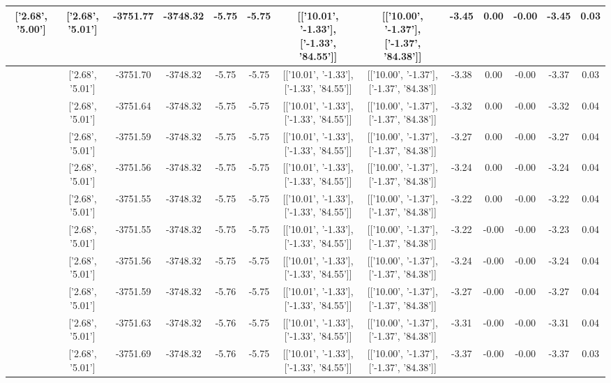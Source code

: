\begin{table}[htbp]
\begin{adjustbox}{angle=90}
\begin{tabular}{|c|c|c|c|c|c|c|c|c|c|c|c|c|}
 ['2.68', '5.00'] & ['2.68', '5.01'] & -3751.77 & -3748.32 & -5.75 & -5.75 & [['10.01', '-1.33'], ['-1.33', '84.55']] & [['10.00', '-1.37'], ['-1.37', '84.38']] & -3.45 & 0.00 & -0.00 & -3.45 & 0.03\\ \hline
 ['2.68', '5.00'] & ['2.68', '5.01'] & -3751.70 & -3748.32 & -5.75 & -5.75 & [['10.01', '-1.33'], ['-1.33', '84.55']] & [['10.00', '-1.37'], ['-1.37', '84.38']] & -3.38 & 0.00 & -0.00 & -3.37 & 0.03\\ \hline
 ['2.68', '5.00'] & ['2.68', '5.01'] & -3751.64 & -3748.32 & -5.75 & -5.75 & [['10.01', '-1.33'], ['-1.33', '84.55']] & [['10.00', '-1.37'], ['-1.37', '84.38']] & -3.32 & 0.00 & -0.00 & -3.32 & 0.04\\ \hline
 ['2.68', '5.00'] & ['2.68', '5.01'] & -3751.59 & -3748.32 & -5.75 & -5.75 & [['10.01', '-1.33'], ['-1.33', '84.55']] & [['10.00', '-1.37'], ['-1.37', '84.38']] & -3.27 & 0.00 & -0.00 & -3.27 & 0.04\\ \hline
 ['2.68', '5.01'] & ['2.68', '5.01'] & -3751.56 & -3748.32 & -5.75 & -5.75 & [['10.01', '-1.33'], ['-1.33', '84.55']] & [['10.00', '-1.37'], ['-1.37', '84.38']] & -3.24 & 0.00 & -0.00 & -3.24 & 0.04\\ \hline
 ['2.68', '5.01'] & ['2.68', '5.01'] & -3751.55 & -3748.32 & -5.75 & -5.75 & [['10.01', '-1.33'], ['-1.33', '84.55']] & [['10.00', '-1.37'], ['-1.37', '84.38']] & -3.22 & 0.00 & -0.00 & -3.22 & 0.04\\ \hline
 ['2.68', '5.01'] & ['2.68', '5.01'] & -3751.55 & -3748.32 & -5.75 & -5.75 & [['10.01', '-1.33'], ['-1.33', '84.55']] & [['10.00', '-1.37'], ['-1.37', '84.38']] & -3.22 & -0.00 & -0.00 & -3.23 & 0.04\\ \hline
 ['2.69', '5.01'] & ['2.68', '5.01'] & -3751.56 & -3748.32 & -5.75 & -5.75 & [['10.01', '-1.33'], ['-1.33', '84.55']] & [['10.00', '-1.37'], ['-1.37', '84.38']] & -3.24 & -0.00 & -0.00 & -3.24 & 0.04\\ \hline
 ['2.69', '5.01'] & ['2.68', '5.01'] & -3751.59 & -3748.32 & -5.76 & -5.75 & [['10.01', '-1.33'], ['-1.33', '84.55']] & [['10.00', '-1.37'], ['-1.37', '84.38']] & -3.27 & -0.00 & -0.00 & -3.27 & 0.04\\ \hline
 ['2.69', '5.01'] & ['2.68', '5.01'] & -3751.63 & -3748.32 & -5.76 & -5.75 & [['10.01', '-1.33'], ['-1.33', '84.55']] & [['10.00', '-1.37'], ['-1.37', '84.38']] & -3.31 & -0.00 & -0.00 & -3.31 & 0.04\\ \hline
 ['2.69', '5.01'] & ['2.68', '5.01'] & -3751.69 & -3748.32 & -5.76 & -5.75 & [['10.01', '-1.33'], ['-1.33', '84.55']] & [['10.00', '-1.37'], ['-1.37', '84.38']] & -3.37 & -0.00 & -0.00 & -3.37 & 0.03\\ \hline

\end{tabular}
\end{adjustbox}
\end{table}
